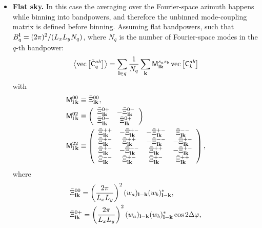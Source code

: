 \documentclass[a4paper,11pt]{article}
\begin{document}
\begin{itemize}
      \item {\bf Flat sky.} In this case the averaging over the Fourier-space azimuth happens while binning into bandpowers, and therefore the unbinned mode-coupling matrix is defined before binning. Assuming flat bandpowers, such that $B_q^{\bf l}=(2\pi)^2/(L_xL_yN_q)$, where $N_q$ is the number of Fourier-space modes in the $q$-th bandpower:
      \begin{equation}
        \left\langle{\rm vec}\left[\tilde{\sf C}^{ab}_q\right]\right\rangle=\sum_{{\bf l}\in q}\frac{1}{N_q} \sum_{\bf k}{\sf M}^{s_as_b}_{{\bf l}{\bf k}}\,{\rm vec}\left[{\sf C}^{ab}_k\right]
      \end{equation}
      with
      \begin{align}
        {\sf M}^{00}_{{\bf l}\,{\bf k}}&\equiv \bar{\Xi}^{00}_{{\bf l}{\bf k}},\\\label{eq:m02_flat}
        {\sf M}^{02}_{{\bf l}\,{\bf k}}&\equiv 
        \left(
        \begin{array}{cc}
         \bar{\Xi}^{0+}_{{\bf l}{\bf k}} & -\bar{\Xi}^{0-}_{{\bf l}{\bf k}} \\
         \bar{\Xi}^{0-}_{{\bf l}{\bf k}} &  \bar{\Xi}^{0+}_{{\bf l}{\bf k}}
        \end{array}\right)\\\label{eq:m22_flat}
        {\sf M}^{22}_{{\bf l}\,{\bf k}}&\equiv 
        \left(
        \begin{array}{cccc}
         \bar{\Xi}^{++}_{{\bf l}{\bf k}} & -\bar{\Xi}^{+-}_{{\bf l}{\bf k}} & -\bar{\Xi}^{+-}_{{\bf l}{\bf k}} &  \bar{\Xi}^{--}_{{\bf l}{\bf k}} \\
         \bar{\Xi}^{+-}_{{\bf l}{\bf k}} &  \bar{\Xi}^{++}_{{\bf l}{\bf k}} & -\bar{\Xi}^{--}_{{\bf l}{\bf k}} & -\bar{\Xi}^{+-}_{{\bf l}{\bf k}} \\
         \bar{\Xi}^{+-}_{{\bf l}{\bf k}} & -\bar{\Xi}^{--}_{{\bf l}{\bf k}} &  \bar{\Xi}^{++}_{{\bf l}{\bf k}} & -\bar{\Xi}^{+-}_{{\bf l}{\bf k}} \\
         \bar{\Xi}^{--}_{{\bf l}{\bf k}} &  \bar{\Xi}^{+-}_{{\bf l}{\bf k}} &  \bar{\Xi}^{+-}_{{\bf l}{\bf k}} & \bar{\Xi}^{++}_{{\bf l}{\bf k}}
        \end{array}\right),
      \end{align}
      where
      \begin{align}
        &\bar{\Xi}^{00}_{{\bf l}{\bf k}}=\left(\frac{2\pi}{L_xL_y}\right)^2 (w_a)_{{\bf l}-{\bf k}}(w_b)^*_{{\bf l}-{\bf k}},\\
        &\bar{\Xi}^{0+}_{{\bf l}{\bf k}}=\left(\frac{2\pi}{L_xL_y}\right)^2 (w_a)_{{\bf l}-{\bf k}}(w_b)^*_{{\bf l}-{\bf k}}\cos2\Delta\varphi,\\

\end{align}
\end{itemize}
\end{document}
